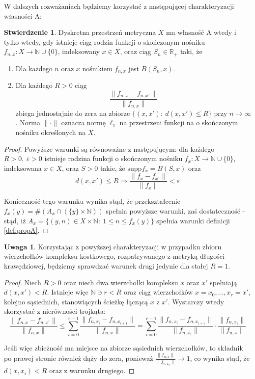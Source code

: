 \documentclass[licencjacka]{pracamgr}
\theoremstyle{definition}
\theoremstyle{definition}
\newtheorem{remark}{Uwaga}[section]
\theoremstyle{definition}
\newtheorem{proposition}{Stwierdzenie}[section]
\theoremstyle{definition}
\theoremstyle{definition}
\theoremstyle{plain}
\theoremstyle{plain}
\begin{document}
W dalszych rozważaniach będziemy korzystać z następującej charakteryzacji własności A:

\begin{proposition}
	Dyskretna przestrzeń metryczna $ X $ ma własność A wtedy i tylko wtedy, gdy 
	istnieje ciąg rodzin funkcji o skończonym nośniku $ f_{n,x} : X \rightarrow \mathbb{N}
	\cup \{0\} $, indeksowany $ x \in X $, oraz ciąg $ S_n \in \mathbb{R}_{+} $ taki, że
	\begin{enumerate}
		\item Dla każdego $ n $ oraz $ x $ nośnikiem $ f_{n,x} $ jest $ B(S_n, x) $.
		\item Dla każdego $ R > 0 $ ciąg $$ \frac{\| f_{n,x} - f_{n,x'} \|}{\| f_{n,x} \|} $$
		zbiega jednostajnie do zera na zbiorze $ \{ (x,x'): ~ d(x,x') \leq R\} $ przy 
		$ n \rightarrow \infty $. Norma $ \| \cdot \| $ oznacza normę $ \ell_1 $ na 
		przestrzeni funkcji na o skończonym nośniku określonych na $ X $.
	\end{enumerate}
\end{proposition}
\begin{proof}
	Powyższe warunki są równoważne z następującym: dla każdego $ R>0, ~ \varepsilon > 0 $ 
	istnieje rodzina funkcji o skończonym nośniku $ f_x : X \rightarrow \mathbb{N} \cup 
	\{0\}$, indeksowana $ x \in X $, oraz $ S > 0 $ takie, że $ \text{supp}{f_x} = B(S,x)  $ 
	oraz $$ d(x,x') \leq R \Rightarrow \frac{\| f_x - f_{x'} \|}{\|f_x \|} < \varepsilon $$

	Konieczność tego warunku wynika stąd, że przekształcenie $ f_x(y) = \#\left( A_x \cap \left( 
	\{y\} \times \mathbb{N} \right) \right) $ spełnia powyższe warunki, zaś dostateczność - 
	stąd, iż $ A_x = \{(y,n) \in X \times \mathbb{N} : ~ 1 \leq n \leq f_x(y) \} $ spełnia 
	warunki definicji \ref{def:propA}.
\end{proof}

\begin{remark}
	Korzystając z powyższej charakteryzacji w przypadku zbioru wierzchołków kompleksu 
	kostkowego, rozpatrywanego z metryką długości krawędziowej, będziemy 
	sprawdzać warunek drugi jedynie dla stałej $ R = 1 $.
\end{remark}
\begin{proof}
	Niech $ R > 0 $ oraz niech dwa wierzchołki kompleksu $ x $ oraz $ x' $ spełniają 
	$d(x,x') < R $. Istnieje więc $ \mathbb{N} \ni  r < R $ oraz ciąg wierzchołków 
	$ x = x_0, \dots, x_r = x' $, kolejno sąsiednich, stanowiących ścieżkę łączącą 
	$ x $ z $ x' $. Wystarczy wtedy skorzystać z nierówności trojkąta:
	$$ \frac{ \| f_{n,x} - f_{n,x'}\|}{\| f_{n,x}\|} \leq \sum\limits_{i=0}^{r-1}
	\frac{ \| f_{n,x_i} - f_{n,x_{i+1}}\|}{\|f_{n,x}\|} = 
	\sum\limits_{i=0}^{r-1} \frac{ \| f_{n,x_i} - f_{n,x_{i+1}}\|}{\|f_{n,x_i}\|}\cdot
	\frac{\|f_{n,x_i}\|}{\|f_{n,x}\|}$$
	
	Jeśli więc zbieżność ma miejsce na zbiorze sąsiednich wierzchołków, to składnik po 
	prawej stronie również dąży do zera, ponieważ $ \frac{\|f_{n,x}\|}{\|f_{n,x_i}\|} 
	\rightarrow 1$, co wynika stąd, że $ d(x,x_i) < R $ oraz z warunku drugiego.
\end{proof}
\end{document}

